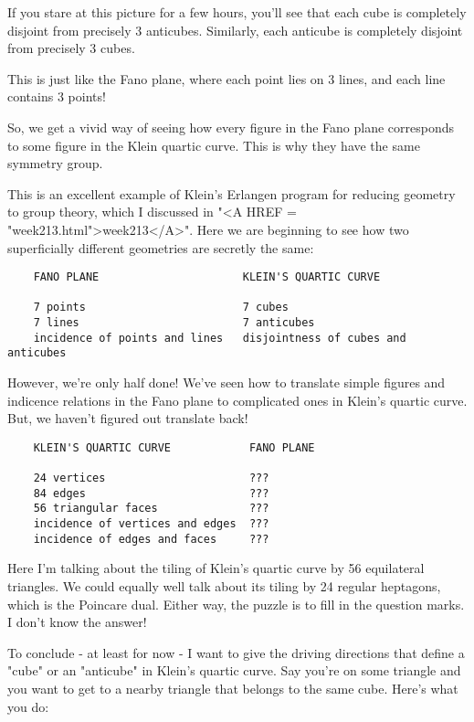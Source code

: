 If you stare at this picture for a few hours, you'll see that each 
cube is completely disjoint from precisely 3 anticubes.  Similarly, 
each anticube is completely disjoint from precisely 3 cubes.  

This is just like the Fano plane, where each point lies on 3 lines, 
and each line contains 3 points!

So, we get a vivid way of seeing how every figure in the Fano 
plane corresponds to some figure in the Klein quartic curve. 
This is why they have the same symmetry group.  

This is an excellent example of Klein's Erlangen program for reducing 
geometry to group theory, which I discussed in "<A HREF = "week213.html">week213</A>".  Here we are 
beginning to see how two superficially different geometries are secretly 
the same:

\begin{verbatim}
    FANO PLANE                      KLEIN'S QUARTIC CURVE
 
    7 points                        7 cubes
    7 lines                         7 anticubes
    incidence of points and lines   disjointness of cubes and anticubes
\end{verbatim}
    
However, we're only half done!  We've seen how to translate simple 
figures and indicence relations in the Fano plane to complicated ones
in Klein's quartic curve.  But, we haven't figured out translate back!
 
\begin{verbatim}
    KLEIN'S QUARTIC CURVE            FANO PLANE
       
    24 vertices                      ??? 
    84 edges                         ???
    56 triangular faces              ???
    incidence of vertices and edges  ???
    incidence of edges and faces     ???
\end{verbatim}
    
Here I'm talking about the tiling of Klein's quartic curve by 56
equilateral triangles.  We could equally well talk about its tiling
by 24 regular heptagons, which is the Poincare dual.  Either way, the
puzzle is to fill in the question marks.  I don't know the answer!

To conclude - at least for now - I want to give the driving directions 
that define a "cube" or an "anticube" in Klein's quartic curve.  Say 
you're on some triangle and you want to get to a nearby triangle that 
belongs to the same cube.  Here's what you do:

